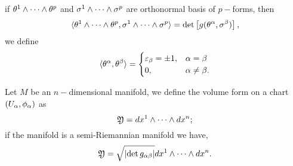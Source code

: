 if $\theta^{1} \wedge \cdots \wedge \theta^{p}$ and $\sigma^{1}\wedge \cdots \wedge \sigma^{p}$ are orthonormal basis of $p-$forms,
then
\begin{equation}
 \label{SA:3.5}
\langle \theta^{1} \wedge \cdots \wedge \theta^{p}, \sigma^{1}\wedge \cdots \wedge \sigma^{p} \rangle = \det \left[g(\theta^{\alpha},
\sigma^{\beta})\right],
\end{equation}
we define
\begin{equation}
 \label{SA:3.6}
\langle \theta^{\alpha}, \theta^{\beta} \rangle =
\begin{cases}
 \varepsilon_{\beta} = \pm 1, & \alpha=\beta \\
0, & \alpha \neq \beta.
\end{cases}
\end{equation}

\begin{defn}
 \label{SA:3.1.3}
Let $M$ be an $n-$dimensional manifold, we define the volume form on a chart $(U_{\alpha}, \phi_{\alpha})$ as
$$
\mathfrak{Y}=dx^{1}\wedge \cdots \wedge dx^{n};
$$
if the manifold is a semi-Riemannian manifold we have,
$$
\mathfrak{Y}= \sqrt{\lvert \det g_{\alpha \beta} \rvert} dx^{1}\wedge \cdots \wedge dx^{n}.
$$
\end{defn}




